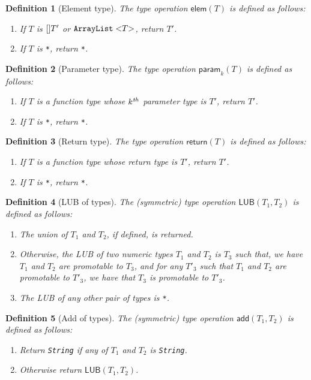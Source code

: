 \makeatletter{}\documentclass[10pt,oneside]{book}
\theoremstyle{note}
\newtheorem{definition}{Definition}[section]
\begin{document}
\begin{definition}[Element type] The type operation $\mathsf{elem}(T)$ is defined as
  follows:
\begin{enumerate}
\item If $T$ is ${\tt []} T'$ or ${\tt ArrayList<}T{\tt>}$, return $T'$.
\item If $T$ is \verb'*', return \verb'*'.
\end{enumerate}
\end{definition}

\begin{definition}[Parameter type] The type operation $\mathsf{param}_k(T)$ is defined as
  follows:
\begin{enumerate}
\item If $T$ is a function type whose $k^{\it th}$ parameter type is $T'$, return $T'$.
\item If $T$ is \verb'*', return \verb'*'.
\end{enumerate}
\end{definition}

\begin{definition}[Return type] The type operation $\mathsf{return}(T)$ is defined as
  follows:
\begin{enumerate}
\item If $T$ is a function type whose return type is $T'$, return $T'$.
\item If $T$ is \verb'*', return \verb'*'.
\end{enumerate}
\end{definition}

\begin{definition}[LUB of types]
The (symmetric) type operation $\mathsf{LUB}(T_1,T_2)$ is defined
as follows:

\begin{enumerate}
\item The union of $T_1$ and $T_2$, if defined, is returned.
\item Otherwise, the LUB of two numeric types $T_1$ and $T_2$ is $T_3$ such that, we have $T_1$ and $T_2$
  are promotable to $T_3$, and for any $T'_3$ such that $T_1$ and $T_2$
  are promotable to $T'_3$, we have that $T_3$ is
  promotable to $T'_3$.
\item The LUB of any other pair of types is \verb'*'.
\end{enumerate}
\end{definition}

\begin{definition}[Add of types] The (symmetric) type operation $\mathsf{add}(T_1,T_2)$ is defined as
  follows:
\begin{enumerate}
\item Return \verb'String'
  if any of $T_1$ and $T_2$ is \verb'String'.
\item Otherwise return $\mathsf{LUB}(T_1,T_2)$.
\end{enumerate}
\end{definition}
\end{document}
